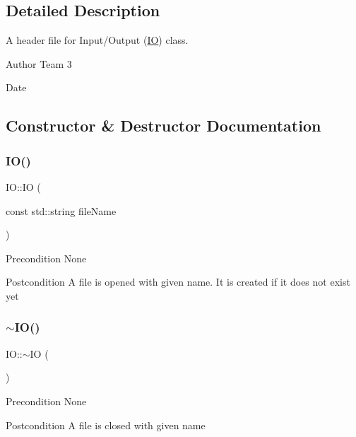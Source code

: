 \subsection{Detailed Description}
A header file for Input/\+Output (\mbox{\hyperlink{class_i_o}{IO}}) class. 

\begin{DoxyAuthor}{Author}
Team 3 
\end{DoxyAuthor}
\begin{DoxyDate}{Date}

\end{DoxyDate}


\subsection{Constructor \& Destructor Documentation}
\mbox{\label{class_i_o_a98e1371822dc63d6b25c4153efd1bbf3}} 
\subsubsection{\texorpdfstring{I\+O()}{IO()}}
{\footnotesize\ttfamily I\+O\+::\+IO (\begin{DoxyParamCaption}\item[{const std\+::string}]{file\+Name }\end{DoxyParamCaption})}

\begin{DoxyPrecond}{Precondition}
None 
\end{DoxyPrecond}
\begin{DoxyPostcond}{Postcondition}
A file is opened with given name. It is created if it does not exist yet 
\end{DoxyPostcond}
\mbox{\label{class_i_o_a44861ff225d351615179f0f24cb8d7f6}} 
\subsubsection{\texorpdfstring{$\sim$\+I\+O()}{~IO()}}
{\footnotesize\ttfamily I\+O\+::$\sim$\+IO (\begin{DoxyParamCaption}{ }\end{DoxyParamCaption})}

\begin{DoxyPrecond}{Precondition}
None 
\end{DoxyPrecond}
\begin{DoxyPostcond}{Postcondition}
A file is closed with given name 
\end{DoxyPostcond}


